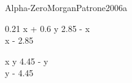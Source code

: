 
\begin{bilevelmodel}{Alpha-Zero}{MorganPatrone2006a}
    \begin{upperlevel}{0.21 x + 0.6 y}{
         2.85 - x  \\ 
 x - 2.85 
    }
    \end{upperlevel}
    \begin{lowerlevel}{x y}{
         4.45 - y  \\ 
 y - 4.45 
    }
    \end{lowerlevel}
\end{bilevelmodel}
    
        